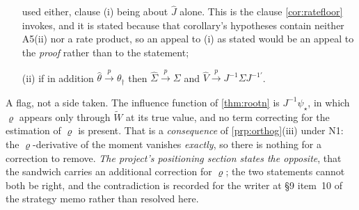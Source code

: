 \begin{lemma}
\begin{enumerate}
used either, clause \textup{(i)} being about $\hat J$ alone.
This is the clause \cref{cor:ratefloor} invokes,
and it is stated because that corollary's hypotheses contain neither A5(ii) nor a rate product, so an appeal
to \textup{(i)} as stated would be an appeal to the \emph{proof} rather than to the statement;
\item[(ii)] if in addition $\hat\theta\xrightarrow{p}\theta_\dagger$ then
$\hat\Sigma\xrightarrow{p}\Sigma$ and $\hat V\xrightarrow{p}J^{-1}\Sigma J^{-1\prime}$.
\end{enumerate}
A flag, not a side taken. The influence function of \cref{thm:rootn} is $J^{-1}\psi_\star$, in which
$\varrho$ appears only through $\widetilde W$ at its true value, and no term correcting for the estimation of
$\varrho$ is present. That is a \emph{consequence} of \cref{prp:orthog}\textup{(iii)} under N1: the
$\varrho$-derivative of the moment vanishes \emph{exactly}, so there is nothing for a correction to remove.
\emph{The project's positioning section states the opposite}, that the sandwich carries an additional
correction for $\varrho$; the two statements cannot both be right, and the contradiction is recorded for the
writer at \S9 item~10 of the strategy memo rather than resolved here.
\end{lemma}

